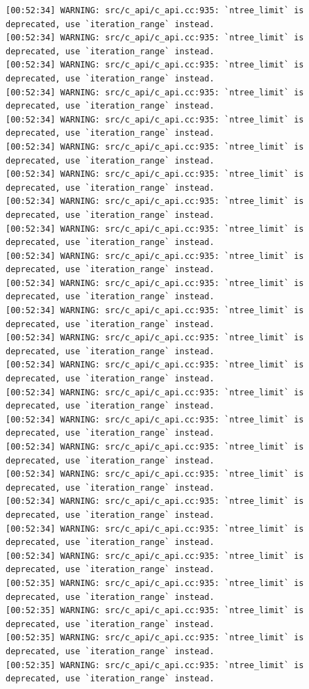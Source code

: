 \documentclass[
  letterpaper,
  DIV=11,
  numbers=noendperiod]{scrartcl}
\begin{document}
\begin{verbatim}
[00:52:34] WARNING: src/c_api/c_api.cc:935: `ntree_limit` is deprecated, use `iteration_range` instead.
[00:52:34] WARNING: src/c_api/c_api.cc:935: `ntree_limit` is deprecated, use `iteration_range` instead.
[00:52:34] WARNING: src/c_api/c_api.cc:935: `ntree_limit` is deprecated, use `iteration_range` instead.
[00:52:34] WARNING: src/c_api/c_api.cc:935: `ntree_limit` is deprecated, use `iteration_range` instead.
[00:52:34] WARNING: src/c_api/c_api.cc:935: `ntree_limit` is deprecated, use `iteration_range` instead.
[00:52:34] WARNING: src/c_api/c_api.cc:935: `ntree_limit` is deprecated, use `iteration_range` instead.
[00:52:34] WARNING: src/c_api/c_api.cc:935: `ntree_limit` is deprecated, use `iteration_range` instead.
[00:52:34] WARNING: src/c_api/c_api.cc:935: `ntree_limit` is deprecated, use `iteration_range` instead.
[00:52:34] WARNING: src/c_api/c_api.cc:935: `ntree_limit` is deprecated, use `iteration_range` instead.
[00:52:34] WARNING: src/c_api/c_api.cc:935: `ntree_limit` is deprecated, use `iteration_range` instead.
[00:52:34] WARNING: src/c_api/c_api.cc:935: `ntree_limit` is deprecated, use `iteration_range` instead.
[00:52:34] WARNING: src/c_api/c_api.cc:935: `ntree_limit` is deprecated, use `iteration_range` instead.
[00:52:34] WARNING: src/c_api/c_api.cc:935: `ntree_limit` is deprecated, use `iteration_range` instead.
[00:52:34] WARNING: src/c_api/c_api.cc:935: `ntree_limit` is deprecated, use `iteration_range` instead.
[00:52:34] WARNING: src/c_api/c_api.cc:935: `ntree_limit` is deprecated, use `iteration_range` instead.
[00:52:34] WARNING: src/c_api/c_api.cc:935: `ntree_limit` is deprecated, use `iteration_range` instead.
[00:52:34] WARNING: src/c_api/c_api.cc:935: `ntree_limit` is deprecated, use `iteration_range` instead.
[00:52:34] WARNING: src/c_api/c_api.cc:935: `ntree_limit` is deprecated, use `iteration_range` instead.
[00:52:34] WARNING: src/c_api/c_api.cc:935: `ntree_limit` is deprecated, use `iteration_range` instead.
[00:52:34] WARNING: src/c_api/c_api.cc:935: `ntree_limit` is deprecated, use `iteration_range` instead.
[00:52:34] WARNING: src/c_api/c_api.cc:935: `ntree_limit` is deprecated, use `iteration_range` instead.
[00:52:35] WARNING: src/c_api/c_api.cc:935: `ntree_limit` is deprecated, use `iteration_range` instead.
[00:52:35] WARNING: src/c_api/c_api.cc:935: `ntree_limit` is deprecated, use `iteration_range` instead.
[00:52:35] WARNING: src/c_api/c_api.cc:935: `ntree_limit` is deprecated, use `iteration_range` instead.
[00:52:35] WARNING: src/c_api/c_api.cc:935: `ntree_limit` is deprecated, use `iteration_range` instead.

\end{verbatim}
\end{document}
